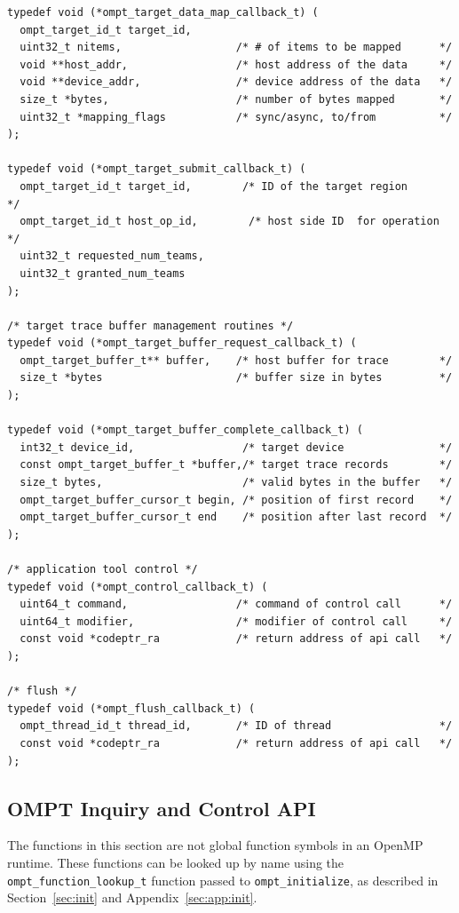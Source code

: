 \documentclass{article}
\begin{document}
\begin{verbatim}
typedef void (*ompt_target_data_map_callback_t) (
  ompt_target_id_t target_id, 
  uint32_t nitems,                  /* # of items to be mapped      */
  void **host_addr,                 /* host address of the data     */
  void **device_addr,               /* device address of the data   */ 
  size_t *bytes,                    /* number of bytes mapped       */
  uint32_t *mapping_flags           /* sync/async, to/from          */
);

typedef void (*ompt_target_submit_callback_t) (
  ompt_target_id_t target_id, 	     /* ID of the target region      */
  ompt_target_id_t host_op_id,	      /* host side ID  for operation  */	
  uint32_t requested_num_teams,
  uint32_t granted_num_teams
);

/* target trace buffer management routines */
typedef void (*ompt_target_buffer_request_callback_t) (
  ompt_target_buffer_t** buffer,    /* host buffer for trace        */
  size_t *bytes                     /* buffer size in bytes         */
);
  
typedef void (*ompt_target_buffer_complete_callback_t) (
  int32_t device_id,                 /* target device               */
  const ompt_target_buffer_t *buffer,/* target trace records        */
  size_t bytes,                      /* valid bytes in the buffer   */
  ompt_target_buffer_cursor_t begin, /* position of first record    */
  ompt_target_buffer_cursor_t end    /* position after last record  */ 
);

/* application tool control */						   
typedef void (*ompt_control_callback_t) (
  uint64_t command,                 /* command of control call      */
  uint64_t modifier,                /* modifier of control call     */
  const void *codeptr_ra            /* return address of api call   */
);

/* flush */
typedef void (*ompt_flush_callback_t) (
  ompt_thread_id_t thread_id,       /* ID of thread                 */
  const void *codeptr_ra            /* return address of api call   */
);

\end{verbatim}


\clearpage
\subsection{OMPT Inquiry and Control API}

The functions in this section are not global function symbols in an OpenMP runtime. These functions can be looked up by name using the \verb|ompt_function_lookup_t| function passed to \verb|ompt_initialize|, as described in Section~\ref{sec:init} and Appendix~\ref{sec:app:init}.
\end{document}
